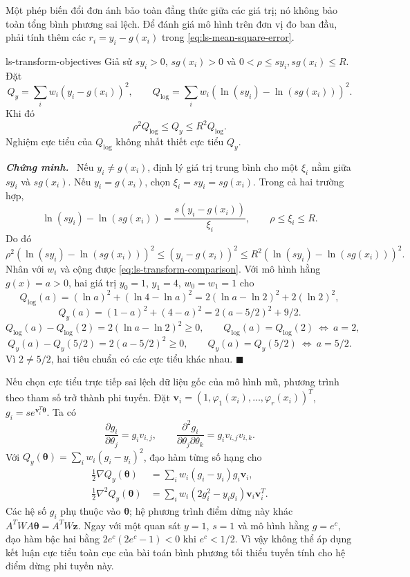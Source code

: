 \documentclass[12pt,a4paper,oneside]{book}
\numberwithin{algorithm}{chapter}
\theoremstyle{definition}
\newenvironment{chungminh}{\par\medskip\noindent\textbf{\textit{\color{mainblue}Chứng minh.}}\ }{\hfill$\blacksquare$\par\medskip}
\begin{document}
Một phép biến đổi đơn ánh bảo toàn đẳng thức giữa các giá trị; nó không bảo toàn tổng bình phương sai lệch. Để đánh giá mô hình trên đơn vị đo ban đầu, phải tính thêm các $r_i=y_i-g(x_i)$ trong \eqref{eq:ls-mean-square-error}.
\begin{menhde}{}{ls-transform-objectives}
Giả sử $sy_i>0$, $sg(x_i)>0$ và $0<\rho\leq sy_i,sg(x_i)\leq R$. Đặt
\[
 Q_y=\sum_iw_i(y_i-g(x_i))^2,\qquad
 Q_{\log}=\sum_iw_i(\ln(sy_i)-\ln(sg(x_i)))^2.
\]
Khi đó
\begin{equation}\label{eq:ls-transform-comparison}
 \rho^2Q_{\log}\leq Q_y\leq R^2Q_{\log}.
\end{equation}
Nghiệm cực tiểu của $Q_{\log}$ không nhất thiết cực tiểu $Q_y$.
\end{menhde}
\begin{chungminh}
Nếu $y_i\ne g(x_i)$, định lý giá trị trung bình cho một $\xi_i$ nằm giữa $sy_i$ và $sg(x_i)$. Nếu $y_i=g(x_i)$, chọn $\xi_i=sy_i=sg(x_i)$. Trong cả hai trường hợp,
\[
 \ln(sy_i)-\ln(sg(x_i))=\frac{s(y_i-g(x_i))}{\xi_i},
 \qquad\rho\leq\xi_i\leq R.
\]
Do đó
\[
 \rho^2(\ln(sy_i)-\ln(sg(x_i)))^2
 \leq(y_i-g(x_i))^2
 \leq R^2(\ln(sy_i)-\ln(sg(x_i)))^2.
\]
Nhân với $w_i$ và cộng được \eqref{eq:ls-transform-comparison}. Với mô hình hằng $g(x)=a>0$, hai giá trị $y_0=1$, $y_1=4$, $w_0=w_1=1$ cho
\[
 Q_{\log}(a)=(\ln a)^2+(\ln4-\ln a)^2
 =2(\ln a-\ln2)^2+2(\ln2)^2,
\]
\[
 Q_y(a)=(1-a)^2+(4-a)^2=2(a-5/2)^2+9/2.
\]
\[
 Q_{\log}(a)-Q_{\log}(2)=2(\ln a-\ln2)^2\geq0,
 \qquad
 Q_{\log}(a)=Q_{\log}(2)\ \Longleftrightarrow\ a=2,
\]
\[
 Q_y(a)-Q_y(5/2)=2(a-5/2)^2\geq0,
 \qquad
 Q_y(a)=Q_y(5/2)\ \Longleftrightarrow\ a=5/2.
\]
Vì $2\ne5/2$, hai tiêu chuẩn có các cực tiểu khác nhau.
\end{chungminh}

Nếu chọn cực tiểu trực tiếp sai lệch dữ liệu gốc của mô hình mũ, phương trình theo tham số trở thành phi tuyến. Đặt $\boldsymbol v_i=(1,\varphi_1(x_i),\ldots,\varphi_r(x_i))^T$, $g_i=s e^{\boldsymbol v_i^T\boldsymbol\theta}$. Ta có
\[
 \frac{\partial g_i}{\partial\theta_j}=g_i v_{i,j},\qquad
 \frac{\partial^2g_i}{\partial\theta_j\partial\theta_k}=g_i v_{i,j}v_{i,k}.
\]
Với $Q_y(\boldsymbol\theta)=\sum_iw_i(g_i-y_i)^2$, đạo hàm từng số hạng cho
\begin{align*}
 \frac12\nabla Q_y(\boldsymbol\theta)
 &=\sum_iw_i(g_i-y_i)g_i\boldsymbol v_i,\\
 \frac12\nabla^2 Q_y(\boldsymbol\theta)
 &=\sum_iw_i(2g_i^2-y_ig_i)\boldsymbol v_i\boldsymbol v_i^T.
\end{align*}
Các hệ số $g_i$ phụ thuộc vào $\boldsymbol\theta$; hệ phương trình điểm dừng này khác $A^TWA\boldsymbol\theta=A^TW\boldsymbol z$. Ngay với một quan sát $y=1$, $s=1$ và mô hình hằng $g=e^c$, đạo hàm bậc hai bằng $2e^c(2e^c-1)<0$ khi $e^c<1/2$. Vì vậy không thể áp dụng kết luận cực tiểu toàn cục của bài toán bình phương tối thiểu tuyến tính cho hệ điểm dừng phi tuyến này.
\end{document}
